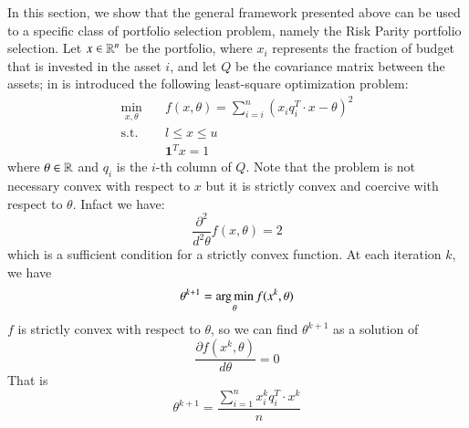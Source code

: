 In this section, we show that the general framework presented above can be used to a specific class of portfolio selection problem, namely the Risk Parity portfolio selection. Let $x \in \mathbb{R}^n$ be the portfolio, where $x_i$ represents the fraction of budget that is invested in the asset $i$, and let $Q$ be the covariance matrix between the assets; in \cite{bai} is introduced the following least-square optimization problem:
\begin{subequations}\label{eq:riskparity} 
\begin{align}
\min_{x,\theta} & \quad f(x,\theta) = \sum_{i=i}^n \left({x_i q_i^T \cdot x} - \theta \right)^2\\
\text{s.t.} & \quad l \leq x \leq u \\
& \quad \mathbf{1}^T x = 1 
\end{align}
\end{subequations}
where $\theta \in \mathbb{R}$ and $q_i$ is the $i$-th column of $Q$. Note that the problem is not necessary convex with respect to $x$ but it is strictly convex and coercive with respect to $\theta$. Infact we have:
\begin{equation}
\frac{\partial^2}{d^2\theta} f(x,\theta) = 2 
\end{equation}
which is a sufficient condition for a strictly convex function. At each iteration $k$, we have 
\begin{equation}
\theta^{k+1} = \operatorname*{arg\,min}_\theta f(x^{k},\theta)
\end{equation}
$f$ is strictly convex with respect to $\theta$, so we can find $\theta^{k+1}$ as a solution of
\begin{equation}
\frac{\partial f(x^{k},\theta)}{d\theta} = 0 
\end{equation}
That is
\begin{equation}
\theta^{k+1} = \frac{\sum_{i=1}^n x_i^{k} q_i^T \cdot x^{k}}{n}
\end{equation}